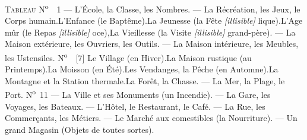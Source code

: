 \begin{VUpage}[2]{}
\VUsaut{3.0mm}
\VUsaut{2.5mm}
\VUsaut{4.0mm}
\VUsaut{4.0mm}
\VUornamento{9pt}
\VUsaut{4.5mm}
\VUsaut{4.0mm}
\VUsaut{2.0mm}
\noindent\textsc{Tableau}\nl
N\textsuperscript{o}\ \ 1 --- L'École, la Classe, les Nombres. --- La Récréation, les Jeux, le Corps humain.\nl
[3] L'Enfance (le Baptême).\nl
[3] La Jeunesse (la Fête \textit{[illisible]} lique).\nl
[4] L'Age mûr (le Repas \textit{[illisible]} oce),\nl
[4] La Vieillesse (la Visite \textit{[illisible]} grand-père). --- La Maison extérieure, les Ouvriers, les Outils. --- La Maison intérieure, les Meubles, les Ustensiles.
\VUsaut{4.0mm}
\VUsaut{2.0mm}
\noindent N\textsuperscript{o}\ \ [7] Le Village (en Hiver).\nl
[7] La Maison rustique (au Printemps).\nl
[8] La Moisson (en Été).\nl
[8] Les Vendanges, la Pêche (en Automne).\nl
[9] La Montagne et la Station thermale.\nl
[9] La Forêt, la Chasse. --- La Mer, la Plage, le Port.
\VUsaut{4.0mm}
\VUsaut{2.0mm}
\noindent N\textsuperscript{o}\ 11 --- La Ville et ses Monuments (un Incendie). --- La Gare, les Voyages, les Bateaux. --- L'Hôtel, le Restaurant, le Café. --- La Rue, les Commerçants, les Métiers. --- Le Marché aux comestibles (la Nourriture). --- Un grand Magasin (Objets de toutes sortes).
\end{VUpage}

\begin{VUpage}[3]{}
\VUsaut{5.0mm}
\VUsaut{2.0mm}
\VUfilet{78mm}
\VUsaut{10.0mm}
\VUsaut{3.0mm}
\VUsaut{4.0mm}
\VUsaut{5.0mm}
\VUsaut{3.0mm}
\VUsaut{4.0mm}
\VUsaut{10.0mm}
\VUornamento{9pt}
\VUsaut{14.0mm}
\VUsaut{2.5mm}
\VUsaut{2.0mm}
\VUsaut{4.0mm}
\VUfilet{8mm}
\VUsaut{3.0mm}
\end{VUpage}

